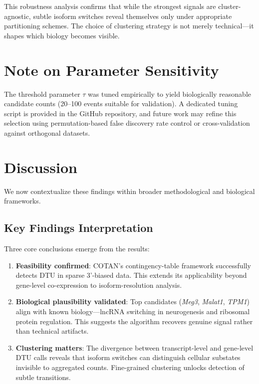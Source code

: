 This robustness analysis confirms that while the strongest signals are cluster-agnostic, subtle isoform switches reveal themselves only under appropriate partitioning schemes. The choice of clustering strategy is not merely technical---it shapes which biology becomes visible.

\section*{Note on Parameter Sensitivity}

The threshold parameter $\tau$ was tuned empirically to yield biologically reasonable candidate counts (20--100 events suitable for validation). A dedicated tuning script is provided in the GitHub repository, and future work may refine this selection using permutation-based false discovery rate control or cross-validation against orthogonal datasets.

\section{Discussion}

We now contextualize these findings within broader methodological and biological frameworks.

\subsection*{Key Findings Interpretation}

Three core conclusions emerge from the results:
\begin{enumerate}
    \item \textbf{Feasibility confirmed}: COTAN's contingency-table framework successfully detects DTU in sparse 3'-biased data. This extends its applicability beyond gene-level co-expression to isoform-resolution analysis.

    \item \textbf{Biological plausibility validated}: Top candidates (\textit{Meg3}, \textit{Malat1}, \textit{TPM1}) align with known biology---lncRNA switching in neurogenesis and ribosomal protein regulation. This suggests the algorithm recovers genuine signal rather than technical artifacts.

    \item \textbf{Clustering matters}: The divergence between transcript-level and gene-level DTU calls reveals that isoform switches can distinguish cellular substates invisible to aggregated counts. Fine-grained clustering unlocks detection of subtle transitions.
\end{enumerate}


